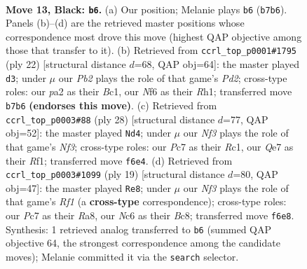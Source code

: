 \documentclass[11pt]{article}
\begin{document}
\clearpage

\begin{figure}[p]\centering
\begin{subfigure}{0.46\textwidth}\centering
\resizebox{\linewidth}{!}{%
\newchessgame
\chessboard[
  setfen={rr4k1/pppbqppp/2n1pn2/8/2BP3P/4PNP1/PP1B1P2/R2QR1K1 b - - 4 13},
  showmover=false,
  pgfstyle=straightmove, color=movearrow, markmove={b7-b6}
]}
\caption{}
\end{subfigure}\hfill
\begin{subfigure}{0.46\textwidth}\centering
\resizebox{\linewidth}{!}{%
\newchessgame
\chessboard[
  setfen={1rbqk2r/4ppbp/2n2np1/1p1p4/1P6/2N2NP1/2QPPPBP/1RB1K2R w Kk - 2 12},
  showmover=false,
  pgfstyle=straightmove, color=movearrow, markmove={d2-d3}
]}
\caption{}
\end{subfigure}
\\[4pt]
\begin{subfigure}{0.46\textwidth}\centering
\resizebox{\linewidth}{!}{%
\newchessgame
\chessboard[
  setfen={rqb2rk1/3n1p1p/p2bpp2/1p6/4P3/1BN2N2/PP2QPPP/2R2RK1 w - - 0 15},
  showmover=false,
  pgfstyle=straightmove, color=movearrow, markmove={f3-d4}
]}
\caption{}
\end{subfigure}\hfill
\begin{subfigure}{0.46\textwidth}\centering
\resizebox{\linewidth}{!}{%
\newchessgame
\chessboard[
  setfen={r1bq1rk1/pp3ppp/2n2n2/2bp4/8/2NBPN1P/PP3PP1/R1BQ1RK1 b - - 0 10},
  showmover=false,
  pgfstyle=straightmove, color=movearrow, markmove={f8-e8}
]}
\caption{}
\end{subfigure}
\caption{\textbf{Move 13, Black: \texttt{b6}.} (a) Our position; Melanie plays \texttt{b6} (\texttt{b7b6}). Panels (b)--(d) are the retrieved master positions whose correspondence most drove this move (highest QAP objective among those that transfer to it). (b) Retrieved from \texttt{ccrl\_top\_p0001\#1795} (ply 22) [structural distance $d$=68, QAP obj=64]: the master played \texttt{d3}; under $\mu$ our \emph{Pb2} plays the role of that game's \emph{Pd2}; cross-type roles: our \emph{p}a2 as their \emph{B}c1, our \emph{N}f6 as their \emph{R}h1; transferred move \texttt{b7b6} \textbf{(endorses this move)}. (c) Retrieved from \texttt{ccrl\_top\_p0003\#88} (ply 28) [structural distance $d$=77, QAP obj=52]: the master played \texttt{Nd4}; under $\mu$ our \emph{Nf3} plays the role of that game's \emph{Nf3}; cross-type roles: our \emph{P}c7 as their \emph{R}c1, our \emph{Q}e7 as their \emph{R}f1; transferred move \texttt{f6e4}. (d) Retrieved from \texttt{ccrl\_top\_p0003\#1099} (ply 19) [structural distance $d$=80, QAP obj=47]: the master played \texttt{Re8}; under $\mu$ our \emph{Nf3} plays the role of that game's \emph{Rf1} (a \textbf{cross-type} correspondence); cross-type roles: our \emph{P}c7 as their \emph{R}a8, our \emph{N}c6 as their \emph{B}c8; transferred move \texttt{f6e8}. Synthesis: 1 retrieved analog transferred to \texttt{b6} (summed QAP objective 64, the strongest correspondence among the candidate moves); Melanie committed it via the \texttt{search} selector.}
\label{fig:thought-m25}
\end{figure}
\end{document}
